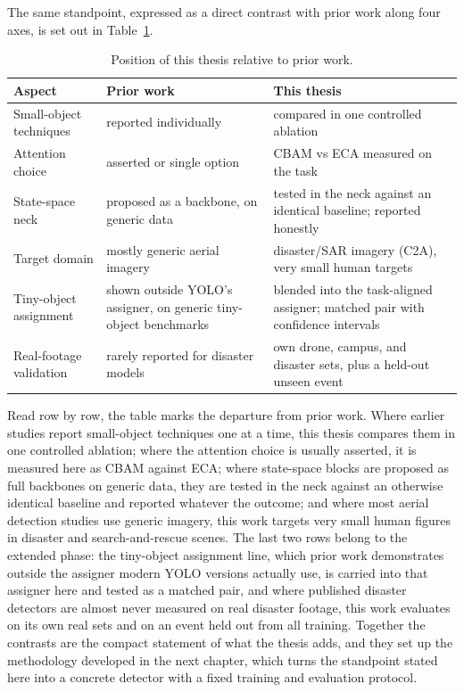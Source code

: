 The same standpoint, expressed as a direct contrast with prior work along four
axes, is set out in Table~\ref{tab:gap}.

\begin{table}[tbp]
  \centering
  \caption{Position of this thesis relative to prior work.}
  \label{tab:gap}
  \small
  \setlength{\tabcolsep}{5pt}
  \begin{tabular}{|p{3.8cm}|p{4.7cm}|p{4.7cm}|}
    \hline
    Aspect & Prior work & This thesis \\
    \hline
    Small-object techniques & reported individually & compared in one controlled ablation \\ \hline
    Attention choice & asserted or single option & CBAM vs ECA measured on the task \\ \hline
    State-space neck & proposed as a backbone, on generic data & tested in the neck against an identical baseline; reported honestly \\ \hline
    Target domain & mostly generic aerial imagery & disaster/SAR imagery (C2A), very small human targets \\ \hline
    Tiny-object assignment & shown outside YOLO's assigner, on generic tiny-object benchmarks & blended into the task-aligned assigner; matched pair with confidence intervals \\ \hline
    Real-footage validation & rarely reported for disaster models & own drone, campus, and disaster sets, plus a held-out unseen event \\
    \hline
  \end{tabular}
\end{table}

Read row by row, the table marks the departure from prior work. Where earlier
studies report small-object techniques one at a time, this thesis compares them
in one controlled ablation; where the attention choice is usually asserted, it
is measured here as CBAM against ECA; where state-space blocks are proposed as
full backbones on generic data, they are tested in the neck against an
otherwise identical baseline and reported whatever the outcome; and where most
aerial detection studies use generic imagery, this work targets very small
human figures in disaster and search-and-rescue scenes. The last two rows
belong to the extended phase: the tiny-object assignment line, which prior
work demonstrates outside the assigner modern YOLO versions actually use, is
carried into that assigner here and tested as a matched pair, and where
published disaster detectors are almost never measured on real disaster
footage, this work evaluates on its own real sets and on an event held out
from all training. Together the contrasts are the compact statement of what
the thesis adds, and they set up the methodology developed in the next
chapter, which turns the standpoint stated here into a concrete detector with
a fixed training and evaluation protocol.

